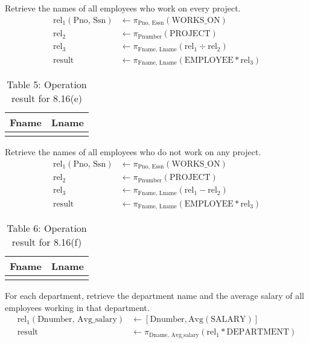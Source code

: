 \documentclass{article}
\begin{document}
\begin{parlist}
    \item Retrieve the names of all employees who work on every project.
    \begin{align*}
        \text{rel}_1(\text{Pno, Ssn}) &\leftarrow \pi_{\text{Pno, Essn}}(\text{WORKS\_ON}) \\
        \text{rel}_2 &\leftarrow \pi_{\text{Pnumber}}(\text{PROJECT}) \\
        \text{rel}_3 &\leftarrow \pi_{\text{Fname, Lname}}(\text{rel}_1 \div \text{rel}_2) \\
        \text{result} &\leftarrow \pi_{\text{Fname, Lname}}(\text{EMPLOYEE} * \text{rel}_3)
    \end{align*}

    \begin{table}[h!]
        \centering
        \caption*{Table 5: Operation result for 8.16(e)}
        \begin{tabularx}{0.5\textwidth}{|C|C|}
            \hline \textbf{Fname} & \textbf{Lname} \\ \hline
             &  \\ \hline
        \end{tabularx}
    \end{table}

    \item Retrieve the names of all employees who do not work on any project.
    \begin{align*}
        \text{rel}_1(\text{Pno, Ssn}) &\leftarrow \pi_{\text{Pno, Essn}}(\text{WORKS\_ON}) \\
        \text{rel}_2 &\leftarrow \pi_{\text{Pnumber}}(\text{PROJECT}) \\
        \text{rel}_3 &\leftarrow \pi_{\text{Fname, Lname}}(\text{rel}_1 - \text{rel}_2) \\
        \text{result} &\leftarrow \pi_{\text{Fname, Lname}}(\text{EMPLOYEE} * \text{rel}_3)
    \end{align*}

    \begin{table}[h!]
        \centering
        \caption*{Table 6: Operation result for 8.16(f)}
        \begin{tabularx}{0.5\textwidth}{|C|C|}
            \hline \textbf{Fname} & \textbf{Lname} \\ \hline
             &  \\ \hline
        \end{tabularx}
    \end{table}

    \newpage
    \item For each department, retrieve the department name and the average salary of all employees working in that department.
    \begin{align*}
        \text{rel}_1(\text{Dnumber, Avg\_salary}) &\leftarrow \left[\text{Dnumber}, \text{Avg}(\text{SALARY})\right] \\
        \text{result} &\leftarrow \pi_{\text{Dname, Avg\_salary}}(\text{rel}_1 * \text{DEPARTMENT})
    \end{align*}


\end{parlist}
\end{document}
